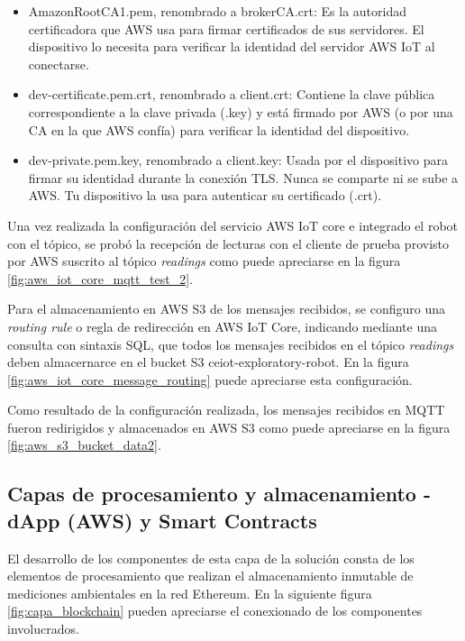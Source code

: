 \begin{itemize}
	\item AmazonRootCA1.pem, renombrado a brokerCA.crt:	Es la autoridad certificadora que AWS usa para firmar certificados de sus servidores. El dispositivo lo necesita para verificar la identidad del servidor AWS IoT al conectarse.
	\item dev-certificate.pem.crt, renombrado a client.crt: Contiene la clave pública correspondiente a la clave privada (.key) y está firmado por AWS (o por una CA en la que AWS confía) para verificar la identidad del dispositivo.
	\item dev-private.pem.key, renombrado a client.key: Usada por el dispositivo para firmar su identidad durante la conexión TLS. Nunca se comparte ni se sube a AWS. Tu dispositivo la usa para autenticar su certificado (.crt).
		
\end{itemize}

Una vez realizada la configuración del servicio AWS IoT core e integrado el robot con el tópico, se probó la recepción de lecturas con el cliente de prueba provisto por AWS suscrito al tópico \textit{readings} como puede apreciarse en la figura \ref{fig:aws_iot_core_mqtt_test_2}.


Para el almacenamiento en AWS S3 de los mensajes recibidos, se configuro una \textit{routing rule} o regla de redirección en AWS IoT Core, indicando mediante una consulta con sintaxis SQL, que todos los mensajes recibidos en el tópico \textit{readings} deben almacernarce en el bucket S3 ceiot-exploratory-robot. En la figura \ref{fig:aws_iot_core_message_routing} puede apreciarse esta configuración.
 


Como resultado de la configuración realizada, los mensajes recibidos en MQTT fueron redirigidos y almacenados en AWS S3 como puede apreciarse en la figura \ref{fig:aws_s3_bucket_data2}.



\subsection{Capas de procesamiento y almacenamiento - dApp (AWS) y Smart Contracts}


El desarrollo de los componentes de esta capa de la solución consta de los elementos de procesamiento que realizan el almacenamiento inmutable de mediciones ambientales en la red Ethereum. En la siguiente figura \ref{fig:capa_blockchain} pueden apreciarse el conexionado de los componentes involucrados.

